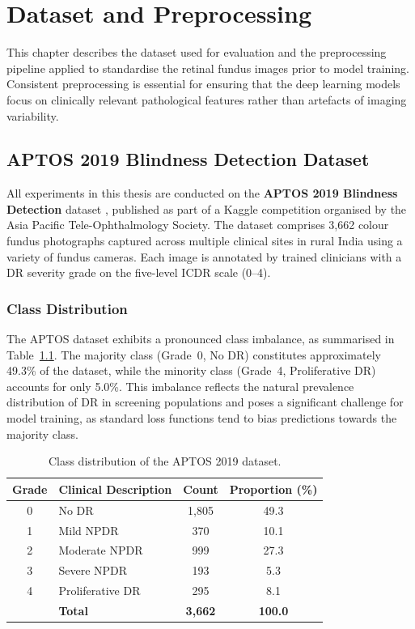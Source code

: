 \chapter{Dataset and Preprocessing}
\label{ch:dataset}

This chapter describes the dataset used for evaluation and the preprocessing pipeline applied to standardise the retinal fundus images prior to model training. Consistent preprocessing is essential for ensuring that the deep learning models focus on clinically relevant pathological features rather than artefacts of imaging variability.

\section{APTOS 2019 Blindness Detection Dataset}
\label{sec:aptos}

All experiments in this thesis are conducted on the \textbf{APTOS 2019 Blindness Detection} dataset \cite{aptos2019}, published as part of a Kaggle competition organised by the Asia Pacific Tele-Ophthalmology Society. The dataset comprises 3,662 colour fundus photographs captured across multiple clinical sites in rural India using a variety of fundus cameras. Each image is annotated by trained clinicians with a DR severity grade on the five-level ICDR scale (0--4).

\subsection{Class Distribution}

The APTOS dataset exhibits a pronounced class imbalance, as summarised in Table~\ref{tab:aptos_distribution}. The majority class (Grade~0, No DR) constitutes approximately 49.3\% of the dataset, while the minority class (Grade~4, Proliferative DR) accounts for only 5.0\%. This imbalance reflects the natural prevalence distribution of DR in screening populations and poses a significant challenge for model training, as standard loss functions tend to bias predictions towards the majority class.

\begin{table}[htbp]
\centering
\caption{Class distribution of the APTOS 2019 dataset.}
\label{tab:aptos_distribution}
\begin{tabular}{clcc}
\toprule
\textbf{Grade} & \textbf{Clinical Description} & \textbf{Count} & \textbf{Proportion (\%)} \\
\midrule
0 & No DR                    & 1,805 & 49.3 \\
1 & Mild NPDR                &   370 & 10.1 \\
2 & Moderate NPDR            &   999 & 27.3 \\
3 & Severe NPDR              &   193 &  5.3 \\
4 & Proliferative DR         &   295 &  8.1 \\
\midrule
  & \textbf{Total}           & \textbf{3,662} & \textbf{100.0} \\
\bottomrule
\end{tabular}
\end{table}

